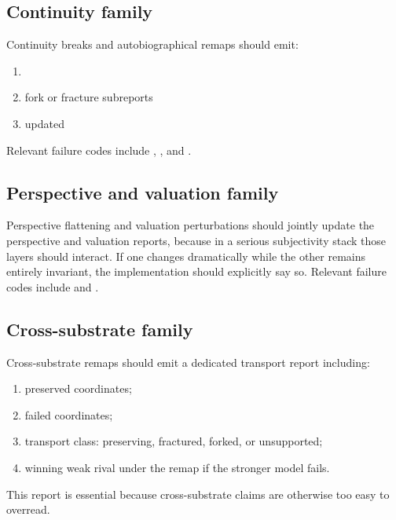 \documentclass[11pt,a4paper]{article}
\theoremstyle{definition}
\begin{document}
\subsection{Continuity family}
Continuity breaks and auto\-bio\-graphical remaps should emit:
\begin{enumerate}[leftmargin=1.5em]
\item \texttt{\allowbreak{}\allowbreak{}\allowbreak{}\allowbreak{}}
\item fork or fracture subreports
\item updated \texttt{\allowbreak{}\allowbreak{}\allowbreak{}\allowbreak{}}
\end{enumerate}
Relevant failure codes include \texttt{\allowbreak{}\allowbreak{}}, \texttt{\allowbreak{}\allowbreak{}\allowbreak{}}, and \texttt{\allowbreak{}\allowbreak{}}.

\subsection{Perspective and valuation family}
Perspective flattening and valuation perturbations should jointly update the perspective and valuation reports, because in a serious subjectivity stack those layers should interact. If one changes dramatically while the other remains entirely invariant, the implementation should explicitly say so. Relevant failure codes include \texttt{\allowbreak{}\allowbreak{}} and \texttt{\allowbreak{}\allowbreak{}}.

\subsection{Cross-substrate family}
Cross-substrate remaps should emit a dedicated transport report including:
\begin{enumerate}[leftmargin=1.5em]
\item preserved coordinates;
\item failed coordinates;
\item transport class: preserving, fractured, forked, or unsupported;
\item winning weak rival under the remap if the stronger model fails.
\end{enumerate}
This report is essential because cross-substrate claims are otherwise too easy to overread.
\end{document}
